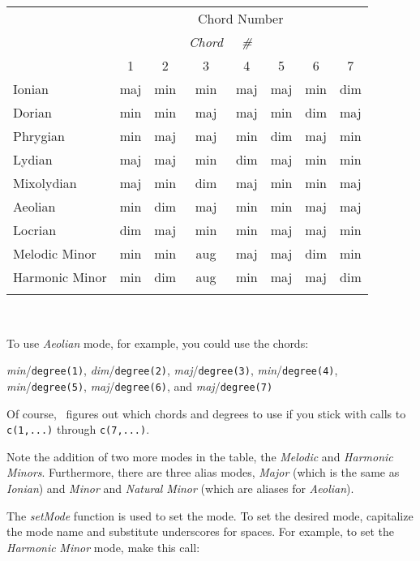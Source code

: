 \documentclass{article}
\begin{document}
\begin{center}
\begin{tabular}{lccccccc}
\T\toprule
\texonly{\multirow{2}{*}{{\it Mode}} & \multicolumn{7}{c}{Chord Number} \\}
\htmlonly{ {\it Mode} & & & {\it Chord} & {\it #} & & & \\}
               & 1   & 2   & 3   & 4   & 5   & 6   & 7   \\
\T\midrule
Ionian         & maj & min & min & maj & maj & min & dim \\
Dorian         & min & min & maj & maj & min & dim & maj \\
Phrygian       & min & maj & maj & min & dim & maj & min \\
Lydian         & maj & maj & min & dim & maj & min & min \\
Mixolydian     & maj & min & dim & maj & min & min & maj \\
Aeolian        & min & dim & maj & min & min & maj & maj \\
Locrian        & dim & maj & min & min & maj & maj & min \\
Melodic Minor  & min & min & aug & maj & maj & dim & min \\
Harmonic Minor & min & dim & aug & min & maj & maj & dim \\
\T\bottomrule
\end{tabular}
\end{center}

\W ~\newline

To use {\it Aeolian} mode, for example, you could use
the chords:

\begin{center}
{\it min}/{\tt degree(1)},
{\it dim}/{\tt degree(2)},
{\it maj}/{\tt degree(3)},
{\it min}/{\tt degree(4)},
{\it min}/{\tt degree(5)},
{\it maj}/{\tt degree(6)},
and {\it maj}/{\tt degree(7)}
\end{center}

Of course, \songlib\ figures out which chords and degrees to use if
you stick with calls to \verb!c(1,...)! through \verb!c(7,...)!.

Note the addition of two more modes in the table, the {\it Melodic}
and {\it Harmonic} {\it Minors}.
Furthermore, there are three alias modes, {\it Major}
(which is the same as {\it Ionian}) and {\it Minor} and
{\it Natural} {\it Minor}
(which are aliases for {\it Aeolian}).

The {\it setMode} function is used to set the mode. To
set the desired mode, capitalize the mode name and
substitute underscores for spaces. For example,
to set the {\it Harmonic} {\it Minor} mode, make this call:
\end{document}
